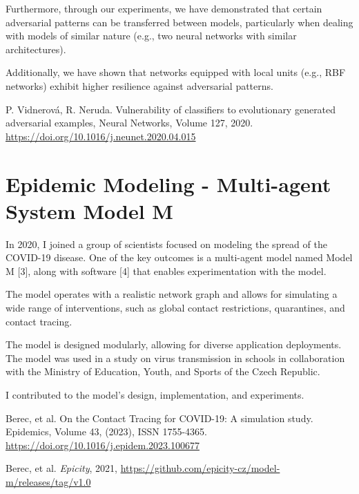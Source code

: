 Furthermore, through our experiments, we have demonstrated that
certain adversarial patterns can be transferred between models,
particularly when dealing with models of similar nature (e.g., two
neural networks with similar architectures).

Additionally, we have shown that networks equipped with local units
(e.g., RBF networks) exhibit higher resilience against adversarial
patterns.

\centerline{}
\noindent
[2] P. Vidnerová, R. Neruda. Vulnerability of classifiers to
evolutionary generated adversarial examples, Neural Networks, Volume
127, 2020.\newline
\href{https://doi.org/10.1016/j.neunet.2020.04.015}{https://doi.org/10.1016/j.neunet.2020.04.015}


\section{Epidemic Modeling - Multi-agent System Model M}
In 2020, I joined a group of scientists focused on modeling the spread
of the COVID-19 disease. One of the key outcomes is a multi-agent
model named Model M [3], along with software [4] that enables
experimentation with the model.

The model operates with a realistic network graph and allows for
simulating a wide range of interventions, such as global contact
restrictions, quarantines, and contact tracing.

The model is designed modularly, allowing for diverse application
deployments. The model was used in a study on virus transmission in
schools in collaboration with the Ministry of Education, Youth, and
Sports of the Czech Republic.

I contributed to the model's design, implementation, and experiments.

\centerline{}
\noindent
[3] Berec, et al. On the Contact Tracing for COVID-19: A simulation
study. Epidemics, Volume 43, (2023), ISSN 1755-4365.
\href{https://doi.org/10.1016/j.epidem.2023.100677}{https://doi.org/10.1016/j.epidem.2023.100677}

\noindent
[4] Berec, et al. {\em Epicity}, 2021,
\href{https://github.com/epicity-cz/model-m/releases/tag/v1.0}{https://github.com/epicity-cz/model-m/releases/tag/v1.0}

